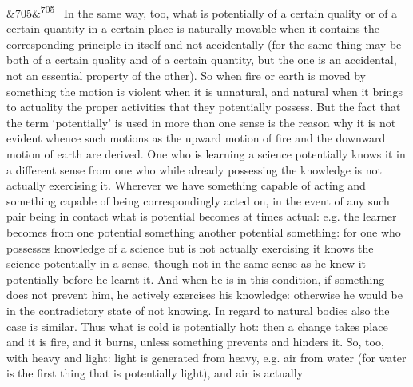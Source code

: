 \documentclass[12pt]{article}
\newcommand{\para}[1][]{\par\noindent\ifx&#1&\else\textsuperscript{\footnotesize #1}~\fi}
\begin{document}
\para[705] In the same way, too, what is potentially of a certain quality or of a certain quantity in a certain place is naturally movable when it contains the corresponding principle in itself and not accidentally (for the same thing may be both of a certain quality and of a certain quantity, but the one is an accidental, not an essential property of the other). So when fire or earth is moved by something the motion is violent when it is unnatural, and natural when it brings to actuality the proper activities that they potentially possess. But the fact that the term ‘potentially’ is used in more than one sense is the reason why it is not evident whence such motions as the upward motion of fire and the downward motion of earth are derived. One who is learning a science potentially knows it in a different sense from one who while already possessing the knowledge is not actually exercising it. Wherever we have something capable of acting and something capable of being correspondingly acted on, in the event of any such pair being in contact what is potential becomes at times actual: e.g. the learner becomes from one potential something another potential something: for one who possesses knowledge of a science but is not actually exercising it knows the science potentially in a sense, though not in the same sense as he knew it potentially before he learnt it. And when he is in this condition, if something does not prevent him, he actively exercises his knowledge: otherwise he would be in the contradictory state of not knowing. In regard to natural bodies also the case is similar. Thus what is cold is potentially hot: then a change takes place and it is fire, and it burns, unless something prevents and hinders it. So, too, with heavy and light: light is generated from heavy, e.g. air from water (for water is the first thing that is potentially light), and air is actually
\end{document}
